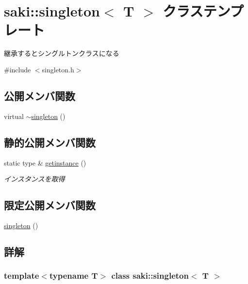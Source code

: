 \hypertarget{classsaki_1_1singleton}{}\section{saki\+:\+:singleton$<$ T $>$ クラステンプレート}
\label{classsaki_1_1singleton}


継承するとシングルトンクラスになる  




{\ttfamily \#include $<$singleton.\+h$>$}

\subsection*{公開メンバ関数}
\begin{DoxyCompactItemize}
\item 
virtual \mbox{\hyperlink{classsaki_1_1singleton_a7e18a317dec7a4658f6d3376f2dd3ebd}{$\sim$singleton}} ()
\end{DoxyCompactItemize}
\subsection*{静的公開メンバ関数}
\begin{DoxyCompactItemize}
\item 
static type \& \mbox{\hyperlink{classsaki_1_1singleton_a507fa8bc891caf1ea18b6dd25475430e}{getinstance}} ()
\begin{DoxyCompactList}\small\item\em インスタンスを取得 \end{DoxyCompactList}\end{DoxyCompactItemize}
\subsection*{限定公開メンバ関数}
\begin{DoxyCompactItemize}
\item 
\mbox{\hyperlink{classsaki_1_1singleton_a511f5d5e51fdac173fa0dbea858f5ee0}{singleton}} ()
\end{DoxyCompactItemize}


\subsection{詳解}
\subsubsection*{template$<$typename T$>$\newline
class saki\+::singleton$<$ T $>$}

